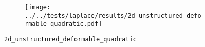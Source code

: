 %
%
\begin{frame}{}
  \vspace*{-0.2cm}
  \begin{figure}[h!]
    \begin{subfigure}[t]{0.48\textwidth}%
      \centering%
      \texttt{[image: ../../tests/laplace/results/2d\_unstructured\_deformable\_quadratic.pdf]}%
    \end{subfigure}%
    \caption{\lstinline{2d_unstructured_deformable_quadratic}}
  \end{figure}
\end{frame}
%
